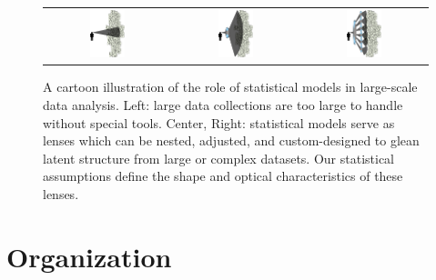 \begin{figure}
  \center
  \begin{tabular}{ccc}
    \includegraphics[width=0.3\textwidth,height=0.3\textwidth]{chapter_introduction/figures/person_data.pdf} &
    \includegraphics[width=0.3\textwidth,height=0.3\textwidth]{chapter_introduction/figures/person_data_lens.pdf} &
    \includegraphics[width=0.3\textwidth,height=0.3\textwidth]{chapter_introduction/figures/person_data_lens2.pdf} \\
  \end{tabular}
  \caption{A cartoon illustration of the role of statistical models in
    large-scale data analysis.  Left: large data collections are too
    large to handle without special tools. Center, Right: statistical
    models serve as lenses which can be nested, adjusted, and
    custom-designed to glean latent structure from large or complex
    datasets.  Our statistical assumptions define the shape and
    optical characteristics of these lenses.}
  \label{figure:person_data_lens}
\end{figure}


\section*{Organization}

